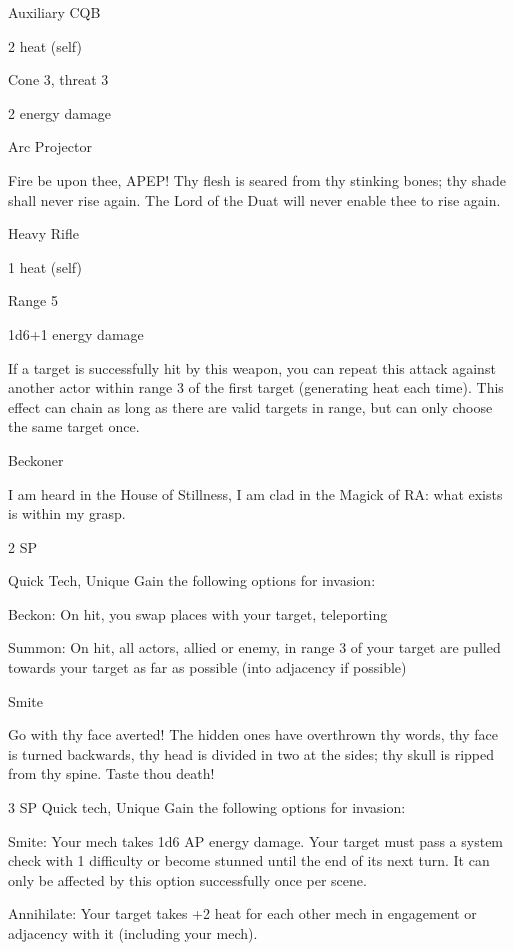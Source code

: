 Auxiliary CQB
 
2 heat (self)
 
Cone 3, threat 3
 
2 energy damage
 

Arc Projector  

Fire be upon thee, APEP! Thy flesh is seared from thy stinking bones; thy shade shall never rise again. The  
Lord of the Duat will never enable thee to rise again.  

Heavy Rifle
 
1 heat (self)
 
Range 5
 
1d6+1 energy damage
 
If a target is successfully hit by this weapon, you can repeat this attack against another actor  
within range 3 of the first target (generating heat each time). This effect can chain as long as  
there are valid targets in range, but can only choose the same target once.
 

Beckoner  

                                                                                                                


I am heard in the House of Stillness, I am clad in the Magick of RA: what exists is within my grasp.  

2 SP  

Quick Tech, Unique  
Gain the following options for invasion:
 
         Beckon: On hit, you swap places with your target, teleporting
 
         Summon: On hit, all actors, allied or enemy, in range 3 of your target are pulled towards  
         your target as far as possible (into adjacency if possible)  
	          

Smite  

Go with thy face averted! The hidden ones have overthrown thy words, thy face is turned backwards, thy  
head is divided in two at the sides; thy skull is ripped from thy spine. Taste thou death!
 

3 SP  
Quick tech, Unique  
Gain the following options for invasion:
 
         	Smite: Your mech takes 1d6 AP energy damage. Your target must pass a system check  
         with 1 difficulty or become stunned until the end of its next turn. It can only be affected by  
         this option successfully once per scene.
 
         Annihilate: Your target takes +2 heat for each other mech in engagement or adjacency  
         with it (including your mech).  

